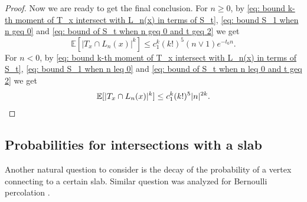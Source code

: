 \documentclass[12pt]{article}
\numberwithin{equation}{section}
\newcommand{\1}{\mathbf{1}}
\begin{document}
\begin{proof}
Now we are ready to get the final conclusion. For $n\geq0$, by \eqref{eq: bound k-th moment of T_x intersect with L_n(x) in terms of S_t}, \eqref{eq: bound S_1 when n geq 0} and \eqref{eq: bound of S_t when n geq 0 and t geq 2} we get 
\[
\mathbb{E}[|T_x\cap L_n(x)|^k]\leq c_{1}^k(k!)^5(n\vee 1)e^{-t_0n}.
\]
For $n<0$, by \eqref{eq: bound k-th moment of T_x intersect with L_n(x) in terms of S_t}, \eqref{eq: bound S_1 when n leq 0} and \eqref{eq: bound of S_t when n leq 0 and t geq 2} we get 
\[
\mathbb{E}[|T_x\cap L_n(x)|^k]\leq c_{1}^k(k!)^5|n|^{2k}.\qedhere
\]
\end{proof}





























 
 
 
 
 
 
 
 
 
 
 
 
 
 
 \subsection{Probabilities for intersections with a slab}
 
 
 
 
 
 
 Another natural question to consider is the decay of the probability of a vertex connecting to a certain slab. Similar question was analyzed for Bernoulli percolation \cite[Lemma 5.2]{Tom2017}.
 
\end{document}
